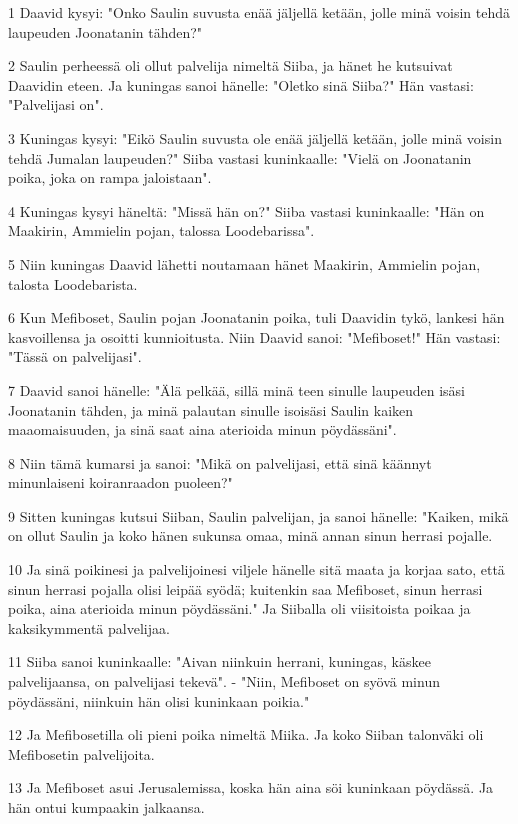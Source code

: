 \par 1 Daavid kysyi: "Onko Saulin suvusta enää jäljellä ketään, jolle minä voisin tehdä laupeuden Joonatanin tähden?"
\par 2 Saulin perheessä oli ollut palvelija nimeltä Siiba, ja hänet he kutsuivat Daavidin eteen. Ja kuningas sanoi hänelle: "Oletko sinä Siiba?" Hän vastasi: "Palvelijasi on".
\par 3 Kuningas kysyi: "Eikö Saulin suvusta ole enää jäljellä ketään, jolle minä voisin tehdä Jumalan laupeuden?" Siiba vastasi kuninkaalle: "Vielä on Joonatanin poika, joka on rampa jaloistaan".
\par 4 Kuningas kysyi häneltä: "Missä hän on?" Siiba vastasi kuninkaalle: "Hän on Maakirin, Ammielin pojan, talossa Loodebarissa".
\par 5 Niin kuningas Daavid lähetti noutamaan hänet Maakirin, Ammielin pojan, talosta Loodebarista.
\par 6 Kun Mefiboset, Saulin pojan Joonatanin poika, tuli Daavidin tykö, lankesi hän kasvoillensa ja osoitti kunnioitusta. Niin Daavid sanoi: "Mefiboset!" Hän vastasi: "Tässä on palvelijasi".
\par 7 Daavid sanoi hänelle: "Älä pelkää, sillä minä teen sinulle laupeuden isäsi Joonatanin tähden, ja minä palautan sinulle isoisäsi Saulin kaiken maaomaisuuden, ja sinä saat aina aterioida minun pöydässäni".
\par 8 Niin tämä kumarsi ja sanoi: "Mikä on palvelijasi, että sinä käännyt minunlaiseni koiranraadon puoleen?"
\par 9 Sitten kuningas kutsui Siiban, Saulin palvelijan, ja sanoi hänelle: "Kaiken, mikä on ollut Saulin ja koko hänen sukunsa omaa, minä annan sinun herrasi pojalle.
\par 10 Ja sinä poikinesi ja palvelijoinesi viljele hänelle sitä maata ja korjaa sato, että sinun herrasi pojalla olisi leipää syödä; kuitenkin saa Mefiboset, sinun herrasi poika, aina aterioida minun pöydässäni." Ja Siiballa oli viisitoista poikaa ja kaksikymmentä palvelijaa.
\par 11 Siiba sanoi kuninkaalle: "Aivan niinkuin herrani, kuningas, käskee palvelijaansa, on palvelijasi tekevä". - "Niin, Mefiboset on syövä minun pöydässäni, niinkuin hän olisi kuninkaan poikia."
\par 12 Ja Mefibosetilla oli pieni poika nimeltä Miika. Ja koko Siiban talonväki oli Mefibosetin palvelijoita.
\par 13 Ja Mefiboset asui Jerusalemissa, koska hän aina söi kuninkaan pöydässä. Ja hän ontui kumpaakin jalkaansa.

